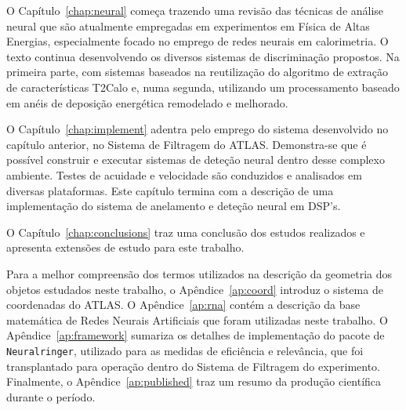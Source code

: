 O Capítulo~\ref{chap:neural} começa trazendo uma revisão das técnicas de
análise neural que são atualmente empregadas em experimentos em Física de
Altas Energias, especialmente focado no emprego de redes neurais em
calorimetria. O texto continua desenvolvendo os diversos sistemas de
discriminação propostos. Na primeira parte, com sistemas baseados na
reutilização do algoritmo de extração de características T2Calo e, numa
segunda, utilizando um processamento baseado em anéis de deposição energética
remodelado e melhorado.

O Capítulo~\ref{chap:implement} adentra pelo emprego do sistema desenvolvido
no capítulo anterior, no Sistema de Filtragem do ATLAS. Demonstra-se que é
possível construir e executar sistemas de deteção neural dentro desse complexo
ambiente. Testes de acuidade e velocidade são conduzidos e analisados em
diversas plataformas. Este capítulo termina com a descrição de uma
implementação do sistema de anelamento e deteção neural em DSP's.

O Capítulo~\ref{chap:conclusions} traz uma conclusão dos estudos realizados e
apresenta extensões de estudo para este trabalho.

Para a melhor compreensão dos termos utilizados na descrição da geometria dos
objetos estudados neste trabalho, o Apêndice~\ref{ap:coord} introduz o sistema
de coordenadas do ATLAS. O Apêndice~\ref{ap:rna} contém a descrição da base
matemática de Redes Neurais Artificiais que foram utilizadas neste trabalho. O
Apêndice~\ref{ap:framework} sumariza os detalhes de implementação do pacote de
 \texttt{Neuralringer}, utilizado para as medidas de eficiência e
relevância, que foi transplantado para operação dentro do Sistema de Filtragem
do experimento. Finalmente, o Apêndice~\ref{ap:published} traz um resumo da
produção científica durante o período.

